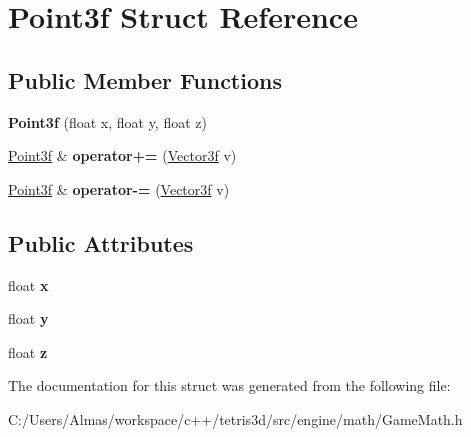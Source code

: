 \hypertarget{struct_point3f}{\section{Point3f Struct Reference}
\label{struct_point3f}
}
\subsection*{Public Member Functions}
\begin{DoxyCompactItemize}
\item 
\hypertarget{struct_point3f_ab50836bbe2c4d404ef1fc82610ff327b}{{\bfseries Point3f} (float x, float y, float z)}\label{struct_point3f_ab50836bbe2c4d404ef1fc82610ff327b}

\item 
\hypertarget{struct_point3f_ac853d962b123d3ccd61c70b2b8bc63d1}{\hyperlink{struct_point3f}{Point3f} \& {\bfseries operator+=} (\hyperlink{struct_vector3f}{Vector3f} v)}\label{struct_point3f_ac853d962b123d3ccd61c70b2b8bc63d1}

\item 
\hypertarget{struct_point3f_aa20c48ce6f5b8a02167b4b5fee90a6ee}{\hyperlink{struct_point3f}{Point3f} \& {\bfseries operator-\/=} (\hyperlink{struct_vector3f}{Vector3f} v)}\label{struct_point3f_aa20c48ce6f5b8a02167b4b5fee90a6ee}

\end{DoxyCompactItemize}
\subsection*{Public Attributes}
\begin{DoxyCompactItemize}
\item 
\hypertarget{struct_point3f_abfc744e013ce815faa5020f095675dd4}{float {\bfseries x}}\label{struct_point3f_abfc744e013ce815faa5020f095675dd4}

\item 
\hypertarget{struct_point3f_a7fb932f23a99ead4e754df956dd61600}{float {\bfseries y}}\label{struct_point3f_a7fb932f23a99ead4e754df956dd61600}

\item 
\hypertarget{struct_point3f_a572109d412d2499243ce3136b7f8c682}{float {\bfseries z}}\label{struct_point3f_a572109d412d2499243ce3136b7f8c682}

\end{DoxyCompactItemize}


The documentation for this struct was generated from the following file\-:\begin{DoxyCompactItemize}
\item 
C\-:/\-Users/\-Almas/workspace/c++/tetris3d/src/engine/math/Game\-Math.\-h\end{DoxyCompactItemize}

